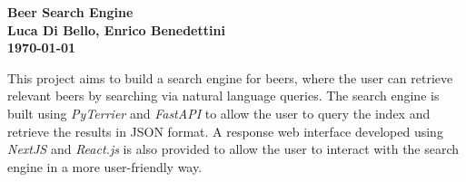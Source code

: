 \documentclass{article}
\begin{document}
\thispagestyle{plain}
\begin{center}
  \Large
  \textbf{Beer Search Engine} \\
  \vspace{0.4cm}
  \textbf{Luca Di Bello, Enrico Benedettini}
  \vspace{0.4cm}
  \textbf{\\ \today}
  \vspace{0.9cm}
\end{center}

\footnotesize

\noindent This project aims to build a search engine for beers, where the user can retrieve relevant beers by searching via natural language queries. The search engine is built using \textit{PyTerrier} and \textit{FastAPI} to allow the user to query the index and retrieve the results in JSON format. A response web interface developed using \textit{NextJS} and \textit{React.js} is also provided to allow the user to interact with the search engine in a more user-friendly way.





\end{document}
